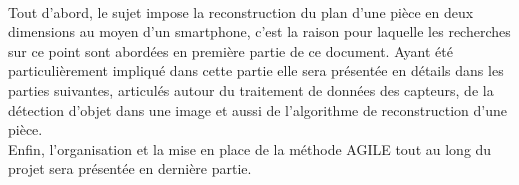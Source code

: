 	\paragraph{}
	Tout d'abord, le sujet impose la reconstruction du plan d'une pièce en deux dimensions au moyen d'un smartphone, c'est la raison pour laquelle les recherches sur ce point sont abordées en première partie de ce document.
	Ayant été particulièrement impliqué dans cette partie elle sera présentée en détails dans les parties suivantes, articulés autour du traitement de données des capteurs, de la détection d'objet dans une image et aussi de l'algorithme de reconstruction d'une pièce.\\
	Enfin, l'organisation et la mise en place de la méthode AGILE tout au long du projet sera présentée en dernière partie.